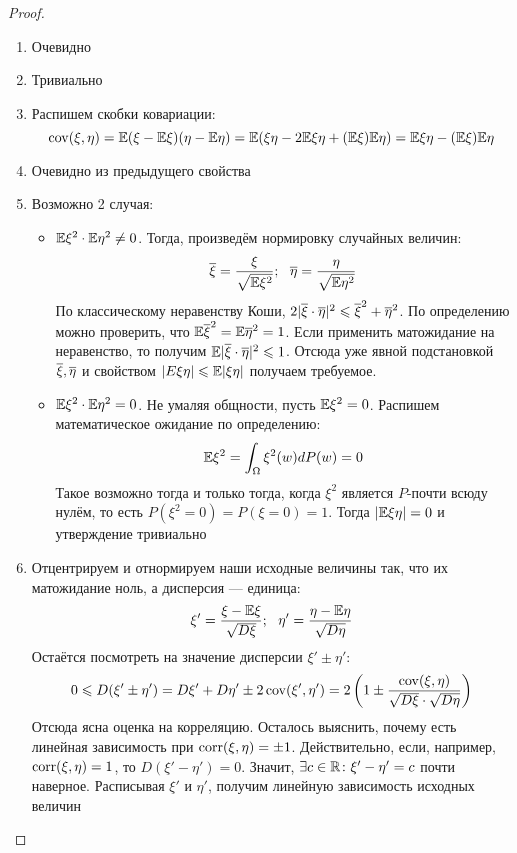 \begin{proof}~
	\begin{enumerate}
		\item Очевидно
		
		\item Тривиально
		
		\item Распишем скобки ковариации:
		\[
			\operatorname{cov}(\xi, \eta) = \mathbb{E}(\xi - \mathbb{E}\xi)(\eta - \mathbb{E}\eta) = \mathbb{E}(\xi\eta - 2\mathbb{E}\xi\eta + (\mathbb{E}\xi)\mathbb{E}\eta) = \mathbb{E}\xi\eta - (\mathbb{E}\xi)\mathbb{E}\eta
		\]
		
		\item Очевидно из предыдущего свойства
		
		\item Возможно 2 случая:
		\begin{itemize}
			\item $\mathbb{E}\xi^2 \cdot \mathbb{E}\eta^2 \neq 0$. Тогда, произведём нормировку случайных величин:
			\[
				\ol{\xi} = \frac{\xi}{\sqrt{\E\xi^2}};\ \ \ol{\eta} = \frac{\eta}{\sqrt{\E\eta^2}}
			\]
			По классическому неравенству Коши, \(2|\overline{\xi} \cdot \overline{\eta}|^2 \leqslant \overline{\xi}^2 + \overline{\eta}^2\). По определению можно проверить, что $\mathbb{E}\overline{\xi}^2 = \mathbb{E}\overline{\eta}^2 = 1$. Если применить матожидание на неравенство, то получим $\mathbb{E}|\overline{\xi} \cdot \overline{\eta}|^2 \leqslant 1$. Отсюда уже явной подстановкой $\overline{\xi}, \overline{\eta}$ и свойством $|E\xi\eta| \leqslant \mathbb{E}|\xi\eta|$ получаем требуемое.
			
			\item $\mathbb{E}\xi^2 \cdot \mathbb{E}\eta^2 = 0$. Не умаляя общности, пусть $\mathbb{E}\xi^2 = 0$. Распишем математическое ожидание по определению:
			\[
				\mathbb{E}\xi^2 = \int_\Omega \xi^2(w)dP(w) = 0
			\]
			Такое возможно тогда и только тогда, когда $\xi^2$ является $P$-почти всюду нулём, то есть $P(\xi^2 = 0) = P(\xi = 0) = 1$. Тогда $|\mathbb{E}\xi\eta| = 0$ и утверждение тривиально
		\end{itemize}
	
		\item Отцентрируем и отнормируем наши исходные величины так, что их матожидание ноль, а дисперсия --- единица:
		\[
			\xi' = \frac{\xi - \mathbb{E}\xi}{\sqrt{D\xi}};\ \ \eta' = \frac{\eta - \mathbb{E}\eta}{\sqrt{D\eta}}
		\]
		Остаётся посмотреть на значение дисперсии $\xi' \pm \eta'$:
		\[
			0 \leqslant D(\xi' \pm \eta') = D\xi' + D\eta' \pm 2\operatorname{cov}(\xi', \eta') = 2\left(1 \pm \frac{\operatorname{cov}(\xi, \eta)}{\sqrt{D\xi} \cdot \sqrt{D\eta}}\right)
		\]
		Отсюда ясна оценка на корреляцию. Осталось выяснить, почему есть линейная зависимость при $\operatorname{corr}(\xi, \eta) = \pm 1$. Действительно, если, например, $\operatorname{corr}(\xi, \eta) = 1$, то $D(\xi' - \eta') = 0$. Значит, $\exists c \in \mathbb{R} \colon \xi' - \eta' = c$ почти наверное. Расписывая $\xi'$ и $\eta'$, получим линейную зависимость исходных величин
	\end{enumerate}
\end{proof}

